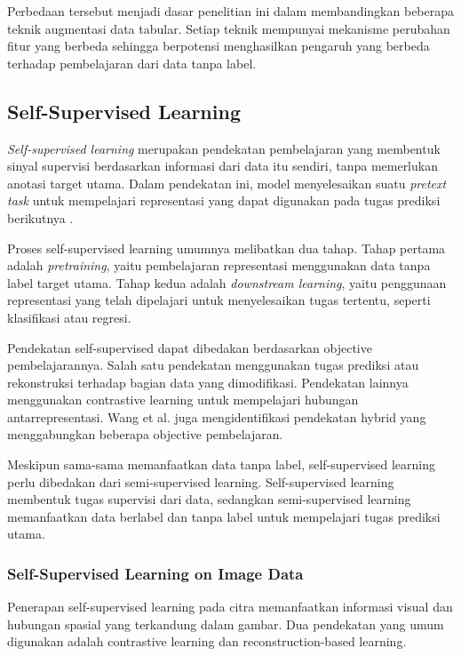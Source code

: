 Perbedaan tersebut menjadi dasar penelitian ini dalam membandingkan beberapa teknik augmentasi data tabular. Setiap teknik mempunyai mekanisme perubahan fitur yang berbeda sehingga berpotensi menghasilkan pengaruh yang berbeda terhadap pembelajaran dari data tanpa label.

\subsection{Self-Supervised Learning}

\textit{Self-supervised learning} merupakan pendekatan pembelajaran yang membentuk sinyal supervisi berdasarkan informasi dari data itu sendiri, tanpa memerlukan anotasi target utama. Dalam pendekatan ini, model menyelesaikan suatu \textit{pretext task} untuk mempelajari representasi yang dapat digunakan pada tugas prediksi berikutnya \cite{ref4}.

Proses self-supervised learning umumnya melibatkan dua tahap. Tahap pertama adalah \textit{pretraining}, yaitu pembelajaran representasi menggunakan data tanpa label target utama. Tahap kedua adalah \textit{downstream learning}, yaitu penggunaan representasi yang telah dipelajari untuk menyelesaikan tugas tertentu, seperti klasifikasi atau regresi.

Pendekatan self-supervised dapat dibedakan berdasarkan objective pembelajarannya. Salah satu pendekatan menggunakan tugas prediksi atau rekonstruksi terhadap bagian data yang dimodifikasi. Pendekatan lainnya menggunakan contrastive learning untuk mempelajari hubungan antarrepresentasi. Wang et al. \cite{ref4} juga mengidentifikasi pendekatan hybrid yang menggabungkan beberapa objective pembelajaran.

Meskipun sama-sama memanfaatkan data tanpa label, self-supervised learning perlu dibedakan dari semi-supervised learning. Self-supervised learning membentuk tugas supervisi dari data, sedangkan semi-supervised learning memanfaatkan data berlabel dan tanpa label untuk mempelajari tugas prediksi utama.

\subsubsection{Self-Supervised Learning on Image Data}

Penerapan self-supervised learning pada citra memanfaatkan informasi visual dan hubungan spasial yang terkandung dalam gambar. Dua pendekatan yang umum digunakan adalah contrastive learning dan reconstruction-based learning.

